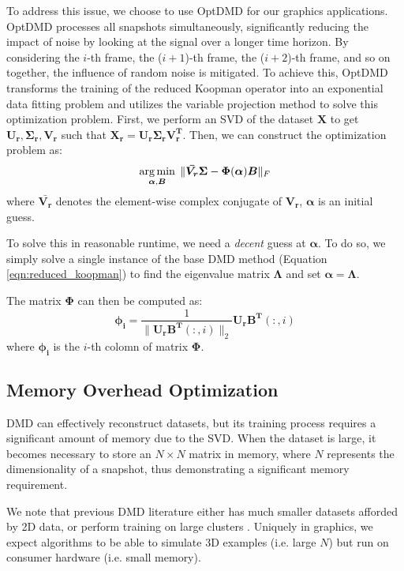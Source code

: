 To address this issue, we choose to use OptDMD \cite{askham2018variable} for our graphics applications. 
OptDMD processes all snapshots simultaneously, significantly reducing the impact of noise by looking at the signal over a longer time horizon. 
By considering the $i$-th frame, the ($i+1$)-th frame, the ($i+2$)-th frame, and so on together, the influence of random noise is mitigated. 
To achieve this, OptDMD transforms the training of the reduced Koopman operator into an exponential data fitting problem and utilizes the variable projection method to solve this optimization problem. 
First, we perform an SVD of the dataset $\bm{X}$ to get $\bm{U_r}, \bm{\Sigma_r}, \bm{V_r}$ such that $\bm{X_r} = \bm{U_r} \bm{\Sigma_r} \bm{V_r^T}$. Then, we can construct the optimization problem as:
\begin{equation}
    \label{eqn:variable_projection}
    \operatorname*{arg\,min}_{\bm{\alpha}, \bm{B}} \; \|\bm{\bar{V_r}\Sigma} - \bm{\Phi}(\bm{\alpha})\bm{B}\|_F
\end{equation}
where $\bm{\bar{V_r}}$ denotes the element-wise complex conjugate of $\bm{V_r}$, $\bm{\alpha}$ is an initial guess. 

To solve this in reasonable runtime, we need a \emph{decent} guess at $\bm{\alpha}$. To do so, we simply solve a single instance of the base DMD method (Equation \ref{eqn:reduced_koopman}) to find the eigenvalue matrix $\bm\Lambda$ and set $\bm\alpha = \bm\Lambda$.

The matrix $\bm{\Phi}$ can then be computed as:
\begin{equation}
     \label{eqn:Phi_OptDND}
    \bm{\phi_i} = \frac{1}{\|\bm{U_r}\bm{B^T}(:,i)\|_2}\bm{U_r}\bm{B^T}(:, i)
\end{equation}
where $\bm{\phi_i}$ is the $i$-th colomn of matrix $\bm{\Phi}$.

\subsection{Memory Overhead Optimization}
DMD can effectively reconstruct datasets, but its training process requires a significant amount of memory due to the SVD. When the dataset is large, it becomes necessary to store an $N\times N$ matrix in memory, where $N$ represents the dimensionality of a snapshot, thus demonstrating a significant memory requirement. 

We note that previous DMD literature either has much smaller datasets afforded by 2D data, or perform training on large clusters \cite{schmid2010dynamic, proctor2016dynamic, askham2018variable, sashidhar2022bagging}. Uniquely in graphics, we expect algorithms to be able to simulate 3D examples (i.e. large $N$) but run on consumer hardware (i.e. small memory). 

